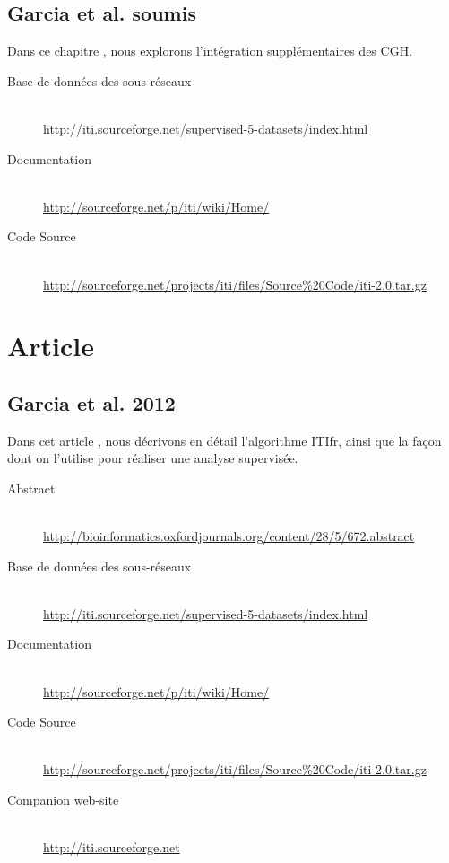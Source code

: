         

      \subsection{\textcolor{mygrey}{Garcia et al. soumis}}\label{app:Garcia2013b}
        Dans ce chapitre \citep{Garcia2013b}, nous explorons l'intégration supplémentaires des CGH.

        \begin{description}
          \item [Base de données des sous-réseaux]    \hfill \\
            \url{http://iti.sourceforge.net/supervised-5-datasets/index.html}
          \item [Documentation]                       \hfill \\
            \url{http://sourceforge.net/p/iti/wiki/Home/}
          \item [Code Source]                         \hfill \\
            \url{http://sourceforge.net/projects/iti/files/Source%20Code/iti-2.0.tar.gz}
        \end{description}

        

  \section{\textcolor{mygrey}{Article}}
    \subsection{\textcolor{mygrey}{Garcia et al. 2012}}\label{app:Garcia2012}
      Dans cet article \citep{Garcia2012}, nous décrivons en détail l'algorithme \acs{ITIfr}, ainsi que la façon dont on l'utilise pour réaliser une analyse supervisée.

        \begin{description}
          \item [Abstract]    \hfill \\
            \url{http://bioinformatics.oxfordjournals.org/content/28/5/672.abstract}
          \item [Base de données des sous-réseaux]    \hfill \\
            \url{http://iti.sourceforge.net/supervised-5-datasets/index.html}
          \item [Documentation]                       \hfill \\
            \url{http://sourceforge.net/p/iti/wiki/Home/}
          \item [Code Source]                         \hfill \\
            \url{http://sourceforge.net/projects/iti/files/Source%20Code/iti-2.0.tar.gz}
          \item [Companion web-site]    \hfill \\
            \url{http://iti.sourceforge.net}
        \end{description}

    
